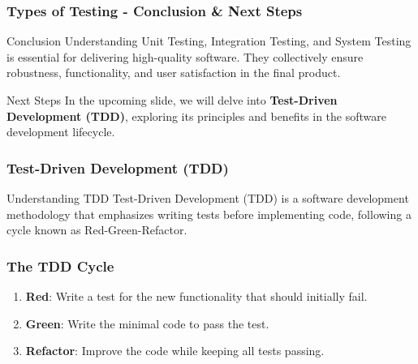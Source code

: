 \documentclass{beamer}
\begin{document}
\begin{frame}[fragile]
    \frametitle{Types of Testing - Conclusion & Next Steps}
    \begin{block}{Conclusion}
        Understanding Unit Testing, Integration Testing, and System Testing is essential for delivering high-quality software. They collectively ensure robustness, functionality, and user satisfaction in the final product.
    \end{block}
    \begin{block}{Next Steps}
        In the upcoming slide, we will delve into \textbf{Test-Driven Development (TDD)}, exploring its principles and benefits in the software development lifecycle.
    \end{block}
\end{frame}

\begin{frame}
    \frametitle{Test-Driven Development (TDD)}
    \begin{block}{Understanding TDD}
        Test-Driven Development (TDD) is a software development methodology that emphasizes writing tests before implementing code, following a cycle known as Red-Green-Refactor.
    \end{block}
\end{frame}

\begin{frame}
    \frametitle{The TDD Cycle}
    \begin{enumerate}
        \item \textbf{Red}: Write a test for the new functionality that should initially fail.
        \item \textbf{Green}: Write the minimal code to pass the test.
        \item \textbf{Refactor}: Improve the code while keeping all tests passing.
    \end{enumerate}
\end{frame}
\end{document}

